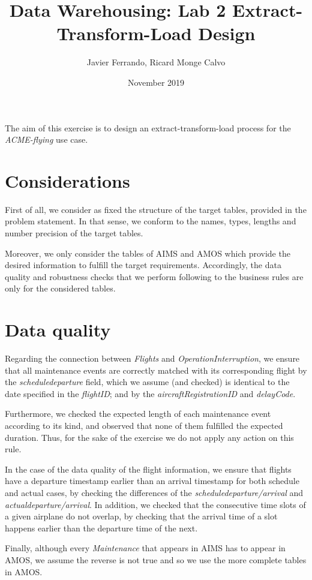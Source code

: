 \documentclass{article} %
\title{Data Warehousing: Lab 2 Extract-Transform-Load Design}
\author{Javier Ferrando, Ricard Monge Calvo}
\date{November 2019}
\begin{document}
\maketitle

The aim of this exercise is to design an extract-transform-load process for the \textit{ACME-flying} use case.

\section{Considerations}

First of all, we consider as fixed the structure of the target tables, provided in the problem statement. In that sense, we conform to the names, types, lengths and number precision of the target tables.

Moreover, we only consider the tables of AIMS and AMOS which provide the desired information to fulfill the target requirements. Accordingly, the data quality and robustness checks that we perform following to the business rules are only for the considered tables.

\section{Data quality}

Regarding the connection between \textit{Flights} and \textit{OperationInterruption}, we ensure that all maintenance events are correctly matched with its corresponding flight by the \textit{scheduledeparture} field, which we assume (and checked) is identical to the date specified in the \textit{flightID}; and by the \textit{aircraftRegistrationID} and \textit{delayCode}.

Furthermore, we checked the expected length of each maintenance event according to its kind, and  observed that none of them fulfilled the expected duration. Thus, for the sake of the exercise we do not apply any action on this rule.

In the case of the data quality of the flight information, we ensure that flights have a departure timestamp earlier than an arrival timestamp for both schedule and actual cases, by checking the differences of the \textit{scheduledeparture/arrival} and \textit{actualdeparture/arrival}. In addition, we checked that the consecutive time slots of a given airplane do not overlap, by checking that the arrival time of a slot happens earlier than the departure time of the next.

Finally, although every \textit{Maintenance} that appears in AIMS has to appear in AMOS, we assume the reverse is not true and so we use the more complete tables in AMOS. 
\end{document}
